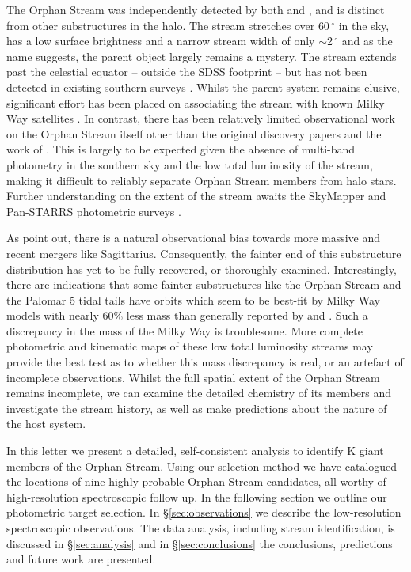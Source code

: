\documentclass[10pt,apjl]{emulateapj}
\begin{document}
The Orphan Stream was independently detected by both \citet{Grillmair_Dionatos_2006} and \citet{Belokurov_et-al_2006}, and is distinct from other substructures in the halo. The stream stretches over $60\,^\circ$ in the sky, has a low surface brightness and a narrow stream width of only $\sim$2\,$^\circ$ and as the name suggests, the parent object largely remains a mystery. The stream extends past the celestial equator \--- outside the SDSS footprint \--- but has not been detected in existing southern surveys \citep{Newberg_et-al_2010}. Whilst the parent system remains elusive, significant effort has been placed on associating the stream with known Milky Way satellites \citep{Zucker_et-al_2006, Fellhaur_et-al_2007,Jin_Lynden_Bell_2007,Sales_et-al_2008}. In contrast, there has been relatively limited observational work on the Orphan Stream itself other than the original discovery papers \citep{Grillmair_Dionatos_2006, Belokurov_et-al_2006, Belokurov_et-al_2007} and the work of \citet{Newberg_et-al_2010}. This is largely to be expected given the absence of multi-band photometry in the southern sky and the low total luminosity of the stream, making it difficult to reliably separate Orphan Stream members from halo stars. Further understanding on the extent of the stream awaits the SkyMapper and Pan-STARRS photometric surveys \citep{Keller_et-al_2007, Hodapp_et-al_2004}.

As \citet{Sales_et-al_2008} point out, there is a natural observational bias towards more massive and recent mergers like Sagittarius. Consequently, the fainter end of this substructure distribution has yet to be fully recovered, or thoroughly examined. Interestingly, there are indications that  some fainter substructures like the Orphan Stream and the Palomar 5 tidal tails \citep{Odenkirchen_et-al_2009} have orbits which seem to be best-fit by Milky Way models with nearly 60\% less mass \citep{Newberg_et-al_2010} than generally reported by \citet{Xue_et-al_2008} and \citet{Koposov_et-al_2010}. Such a discrepancy in the mass of the Milky Way is troublesome. More complete photometric and kinematic maps of these low total luminosity streams may provide the best test as to whether this mass discrepancy is real, or an artefact of incomplete observations. Whilst the full spatial extent of the Orphan Stream remains incomplete, we can examine the detailed chemistry of its members and investigate the stream history, as well as make predictions about the nature of the host system.

In this letter we present a detailed, self-consistent analysis to identify K giant members of the Orphan Stream. Using our selection method we have catalogued the locations of nine highly probable Orphan Stream candidates, all worthy of high-resolution spectroscopic follow up. In the following section we outline our photometric target selection. In \S\ref{sec:observations} we describe the low-resolution spectroscopic observations. The data analysis, including stream identification, is discussed in \S\ref{sec:analysis} and in \S\ref{sec:conclusions} the conclusions, predictions and future work are presented.
\end{document}
